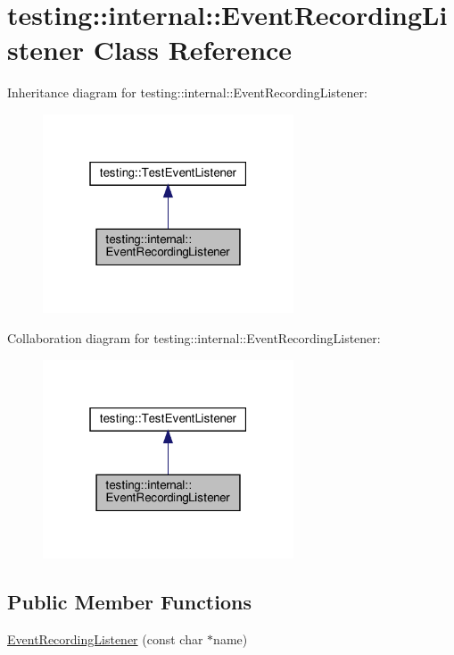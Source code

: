 \hypertarget{classtesting_1_1internal_1_1_event_recording_listener}{}\section{testing\+:\+:internal\+:\+:Event\+Recording\+Listener Class Reference}
\label{classtesting_1_1internal_1_1_event_recording_listener}


Inheritance diagram for testing\+:\+:internal\+:\+:Event\+Recording\+Listener\+:
\nopagebreak
\begin{figure}[H]
\begin{center}
\leavevmode
\includegraphics[width=211pt]{classtesting_1_1internal_1_1_event_recording_listener__inherit__graph}
\end{center}
\end{figure}


Collaboration diagram for testing\+:\+:internal\+:\+:Event\+Recording\+Listener\+:
\nopagebreak
\begin{figure}[H]
\begin{center}
\leavevmode
\includegraphics[width=211pt]{classtesting_1_1internal_1_1_event_recording_listener__coll__graph}
\end{center}
\end{figure}
\subsection*{Public Member Functions}
\begin{DoxyCompactItemize}
\item 
\hyperlink{classtesting_1_1internal_1_1_event_recording_listener_a7b0254c15d6b8468e1441ee572fee707}{Event\+Recording\+Listener} (const char $\ast$name)
\end{DoxyCompactItemize}
